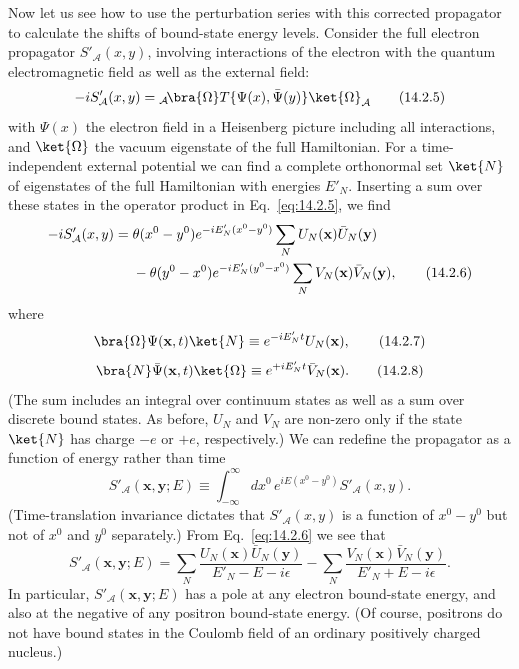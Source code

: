 Now let us see how to use the perturbation series with this corrected
propagator to calculate the shifts of bound-state energy levels. Consider the
full electron propagator $S'_{\mathcal A}(x,y)$, involving interactions of the
electron with the quantum electromagnetic field as well as the external field:
\begin{equation}
 -iS'_{\mathcal A}(x,y)
 ={}_{\mathcal A}\!\bra{\Omega}T\{\Psi(x),\bar\Psi(y)\}\ket{\Omega}_{\mathcal A}
 \tag{14.2.5}\label{eq:14.2.5}
\end{equation}
with $\Psi(x)$ the electron field in a Heisenberg picture including all
interactions, and $\ket{\Omega}$ the vacuum eigenstate of the full Hamiltonian.
For a time-independent external potential we can find a complete orthonormal
set $\ket{N}$ of eigenstates of the full Hamiltonian with energies $E'_N$.
Inserting a sum over these states in the operator product in
Eq.~\eqref{eq:14.2.5}, we find
\begin{align}
 -iS'_{\mathcal A}(x,y)={}&\theta(x^0-y^0)e^{-iE'_N(x^0-y^0)}
 \sum_NU_N(\mathbf x)\bar U_N(\mathbf y)
 \notag\\
 &-\theta(y^0-x^0)e^{-iE'_N(y^0-x^0)}
 \sum_NV_N(\mathbf x)\bar V_N(\mathbf y),
 \tag{14.2.6}\label{eq:14.2.6}
\end{align}
where
\begin{equation}
 \bra{\Omega}\Psi(\mathbf x,t)\ket{N}\equiv e^{-iE'_Nt}U_N(\mathbf x),
 \tag{14.2.7}\label{eq:14.2.7}
\end{equation}
\begin{equation}
 \bra{N}\bar\Psi(\mathbf x,t)\ket{\Omega}\equiv e^{+iE'_Nt}\bar V_N(\mathbf x).
 \tag{14.2.8}\label{eq:14.2.8}
\end{equation}
(The sum includes an integral over continuum states as well as a sum over
discrete bound states. As before, $U_N$ and $V_N$ are non-zero only if the state
$\ket{N}$ has charge $-e$ or $+e$, respectively.) We can redefine the
propagator as a function of energy rather than time
\begin{equation}
 S'_{\mathcal A}(\mathbf x,\mathbf y;E)
 \equiv\int_{-\infty}^{\infty}dx^0\,e^{iE(x^0-y^0)}S'_{\mathcal A}(x,y).
 \tag{14.2.9}\label{eq:14.2.9}
\end{equation}
(Time-translation invariance dictates that $S'_{\mathcal A}(x,y)$ is a function
of $x^0-y^0$ but not of $x^0$ and $y^0$ separately.) From
Eq.~\eqref{eq:14.2.6} we see that
\begin{equation}
 S'_{\mathcal A}(\mathbf x,\mathbf y;E)
 =\sum_N\frac{U_N(\mathbf x)\bar U_N(\mathbf y)}{E'_N-E-i\epsilon}
 -\sum_N\frac{V_N(\mathbf x)\bar V_N(\mathbf y)}{E'_N+E-i\epsilon}.
 \tag{14.2.10}\label{eq:14.2.10}
\end{equation}
In particular, $S'_{\mathcal A}(\mathbf x,\mathbf y;E)$ has a pole at any
electron bound-state energy, and also at the negative of any positron
bound-state energy. (Of course, positrons do not have bound states in the
Coulomb field of an ordinary positively charged nucleus.)

